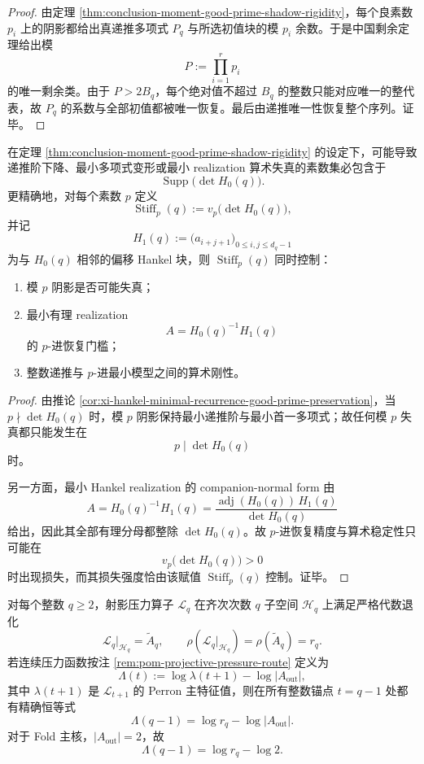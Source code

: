 \begin{proof}
由定理 \ref{thm:conclusion-moment-good-prime-shadow-rigidity}，每个良素数 \(p_i\) 上的阴影都给出真递推多项式 \(P_q\) 与所选初值块的模 \(p_i\) 余数。于是中国剩余定理给出模
\[
P:=\prod_{i=1}^{r}p_i
\]
的唯一剩余类。由于 \(P>2B_q\)，每个绝对值不超过 \(B_q\) 的整数只能对应唯一的整代表，故 \(P_q\) 的系数与全部初值都被唯一恢复。最后由递推唯一性恢复整个序列。证毕。
\end{proof}

\begin{proposition}\label{prop:conclusion-moment-hankel-bad-prime-stiffness-support}
在定理 \ref{thm:conclusion-moment-good-prime-shadow-rigidity} 的设定下，可能导致递推阶下降、最小多项式变形或最小 realization 算术失真的素数集必包含于
\[
\operatorname{Supp}\bigl(\det H_0(q)\bigr).
\]
更精确地，对每个素数 \(p\) 定义
\[
\operatorname{Stiff}_p(q):=v_p\!\bigl(\det H_0(q)\bigr),
\]
并记
\[
H_1(q):=\bigl(a_{i+j+1}\bigr)_{0\le i,j\le d_q-1}
\]
为与 \(H_0(q)\) 相邻的偏移 Hankel 块，则 \(\operatorname{Stiff}_p(q)\) 同时控制：
\begin{enumerate}
  \item 模 \(p\) 阴影是否可能失真；
  \item 最小有理 realization
  \[
  A=H_0(q)^{-1}H_1(q)
  \]
  的 \(p\)-进恢复门槛；
  \item 整数递推与 \(p\)-进最小模型之间的算术刚性。
\end{enumerate}
\end{proposition}

\begin{proof}
由推论 \ref{cor:xi-hankel-minimal-recurrence-good-prime-preservation}，当 \(p\nmid \det H_0(q)\) 时，模 \(p\) 阴影保持最小递推阶与最小首一多项式；故任何模 \(p\) 失真都只能发生在
\[
p\mid \det H_0(q)
\]
时。

另一方面，最小 Hankel realization 的 companion-normal form 由
\[
A=H_0(q)^{-1}H_1(q)
=\frac{\operatorname{adj}(H_0(q))\,H_1(q)}{\det H_0(q)}
\]
给出，因此其全部有理分母都整除 \(\det H_0(q)\)。故 \(p\)-进恢复精度与算术稳定性只可能在
\[
v_p\!\bigl(\det H_0(q)\bigr)>0
\]
时出现损失，而其损失强度恰由该赋值 \(\operatorname{Stiff}_p(q)\) 控制。证毕。
\end{proof}

\begin{theorem}[连续压力的整数阶代数锚点]\label{thm:conclusion-projective-pressure-integer-algebraic-anchor}
对每个整数 \(q\ge 2\)，射影压力算子 \(\mathcal L_q\) 在齐次次数 \(q\) 子空间 \(\mathcal H_q\) 上满足严格代数退化
\[
\mathcal L_q\vert_{\mathcal H_q}=\widetilde A_q,
\qquad
\rho(\mathcal L_q\vert_{\mathcal H_q})=\rho(\widetilde A_q)=r_q.
\]
若连续压力函数按注 \ref{rem:pom-projective-pressure-route} 定义为
\[
\Lambda(t):=\log\lambda(t+1)-\log |A_{\mathrm{out}}|,
\]
其中 \(\lambda(t+1)\) 是 \(\mathcal L_{t+1}\) 的 Perron 主特征值，则在所有整数锚点 \(t=q-1\) 处都有精确恒等式
\[
\Lambda(q-1)=\log r_q-\log |A_{\mathrm{out}}|.
\]
对于 Fold 主核，\(|A_{\mathrm{out}}|=2\)，故
\[
\Lambda(q-1)=\log r_q-\log 2.
\]
\end{theorem}

